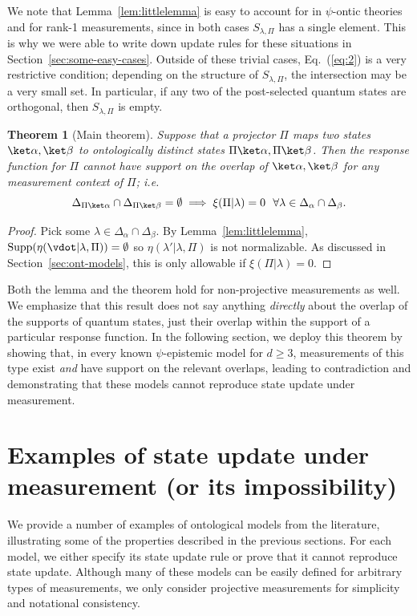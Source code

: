 \documentclass[%
 reprint,
superscriptaddress,
nofootinbib,
 amsmath,amssymb,
 prx, 
 accepted=2019-09-27,
]{quantumarticle}
\newtheorem{theorem}{Theorem}
\newcommand{\supp}{\textup{Supp}}
\begin{document}
We note that Lemma~\ref{lem:littlelemma} is easy to account for in
$\psi$-ontic theories and for rank-1 measurements, since in both cases
$S_{\lambda,\Pi}$ has a single element. This is why we were able to
write down update rules for these situations in
Section~\ref{sec:some-easy-cases}.  Outside of these trivial cases,
Eq.~(\ref{eq:2}) is a very restrictive condition; depending on the
structure of $S_{\lambda,\Pi}$, the intersection may be a very small
set. In particular, if any two of the post-selected quantum states are
orthogonal, then $S_{\lambda,\Pi}$ is empty.

\begin{theorem}[Main theorem]
  \label{thm:main-thm}
  Suppose that a projector $\Pi$ maps two states
  $\ket\alpha,\ket\beta$ to ontologically distinct states
  $\Pi\ket\alpha,\Pi\ket\beta$. Then the response function for $\Pi$
  cannot have support on the overlap of $\ket\alpha,\ket\beta$ for any
  measurement context of $\Pi$; i.e.
  \begin{equation}
    \label{eq:3}
    \Delta_{\Pi\ket\alpha}\cap\Delta_{\Pi\ket\beta}=\emptyset
    \implies \xi(\Pi|\lambda) = 0 \ \ \forall \lambda\in\Delta_\alpha\cap\Delta_\beta.
  \end{equation}
\end{theorem}
\begin{proof}
  Pick some $\lambda\in\Delta_\alpha\cap\Delta_\beta$. By
  Lemma~\ref{lem:littlelemma},
  $\supp(\eta(\vdot|\lambda,\Pi))=\emptyset$ so
  $\eta(\lambda'|\lambda,\Pi)$ is not normalizable. As discussed in
  Section~\ref{sec:ont-models}, this is only allowable if
  $\xi(\Pi|\lambda)=0$.
\end{proof}

Both the lemma and the theorem hold for non-projective measurements as
well. We emphasize that this result does not say anything
\emph{directly} about the overlap of the supports of quantum states,
just their overlap within the support of a particular response
function. In the following section, we deploy this theorem by showing 
that, in every known $\psi$-epistemic model for $d\geq3$, measurements
of this type exist \emph{and} have support on the relevant overlaps,
leading to contradiction and demonstrating that these models cannot
reproduce state update under measurement.



\section{Examples of state update under measurement (or its impossibility)}
\label{sec:exampl-ontol-models}
We provide a number of examples of ontological models from the
literature, illustrating some of the properties described in the
previous sections. For each model, we either specify its state update
rule or prove that it cannot reproduce state update. Although many of
these models can be easily defined for arbitrary types of
measurements, we only consider projective measurements for simplicity
and notational consistency.
 
\end{document}
